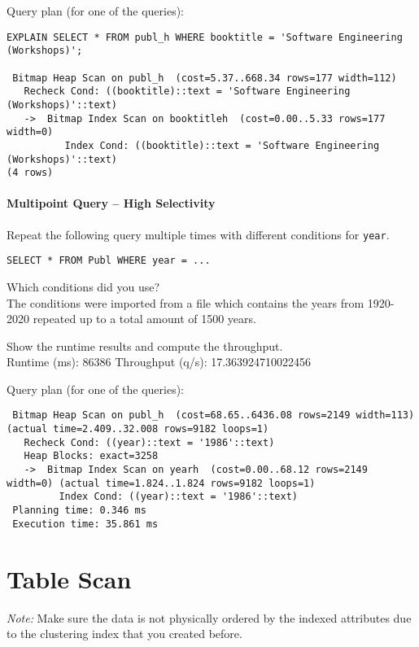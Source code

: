\documentclass[11pt]{scrartcl}
\begin{document}
\smallskip\noindent
Query plan (for one of the queries):
\begin{verbatim}
EXPLAIN SELECT * FROM publ_h WHERE booktitle = 'Software Engineering (Workshops)';

 Bitmap Heap Scan on publ_h  (cost=5.37..668.34 rows=177 width=112)
   Recheck Cond: ((booktitle)::text = 'Software Engineering (Workshops)'::text)
   ->  Bitmap Index Scan on booktitleh  (cost=0.00..5.33 rows=177 width=0)
          Index Cond: ((booktitle)::text = 'Software Engineering (Workshops)'::text)
(4 rows)
\end{verbatim}


\paragraph{Multipoint Query -- High Selectivity}

Repeat the following query multiple times with different conditions for {\tt year}.

{\small
\begin{verbatim}
SELECT * FROM Publ WHERE year = ...
\end{verbatim}
}

\noindent
Which conditions did you use?\\
The conditions were imported from a file which contains the years from 1920-2020 repeated up to a total amount of 1500 years.

\smallskip\noindent
Show the runtime results and compute the throughput.\\
Runtime (ms): 86386
Throughput (q/s): 17.363924710022456

\smallskip\noindent
Query plan (for one of the queries):
{\small
\begin{verbatim}
 Bitmap Heap Scan on publ_h  (cost=68.65..6436.08 rows=2149 width=113) (actual time=2.409..32.008 rows=9182 loops=1)
   Recheck Cond: ((year)::text = '1986'::text)
   Heap Blocks: exact=3258
   ->  Bitmap Index Scan on yearh  (cost=0.00..68.12 rows=2149 width=0) (actual time=1.824..1.824 rows=9182 loops=1)
         Index Cond: ((year)::text = '1986'::text)
 Planning time: 0.346 ms
 Execution time: 35.861 ms
\end{verbatim}
}


\section{Table Scan}

\noindent \emph{Note:} Make sure the data is not physically ordered by
the indexed attributes due to the clustering index that you created
before.
\end{document}
